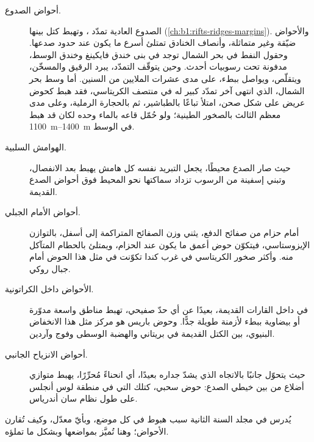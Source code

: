 \begin{description}
  \item[أحواض الصدوع.] الصدوع العادية تمدّد ، وتهبط كتل بينها (\cref{ch:b1:rifts-ridges-margins}). والأحواض ضيّقة وغير متماثلة، وأنصاف الخنادق تمتلئ أسرع ما يكون عند حدود صدعها. وحقول النفط في بحر الشمال توجد في بنى خندق فايكينغ وخندق الوسط، مدفونة تحت رسوبيات أحدث. وحين يتوقّف التمدّد، يبرد  الرقيق والمسخّن، ويتقلّص، ويواصل  ببطء، على مدى عشرات الملايين من السنين. أما وسط بحر الشمال، الذي انتهى آخر تمدّد كبير له في منتصف الكريتاسي، فقد هبط كحوض عريض على شكل صحن، امتلأ تباعًا بالطباشير، ثم بالحجارة الرملية، وعلى مدى معظم الثالث بالصخور الطينية؛ ولو حُمّل قاعه بالماء وحده لكان قد هبط \qtyrange{1100}{1400}{m} في الوسط.
  \item[الهوامش السلبية.] حيث صار الصدع محيطًا، يجعل التبريد نفسه كل هامش يهبط بعد الانفصال، وتبني إسفينة من الرسوب تزداد سماكتها نحو المحيط فوق أحواض الصدع القديمة.
  \item[أحواض الأمام الجبلي.] أمام حزام من صفائح الدفع، يثني وزن الصفائح المتراكمة  إلى أسفل، بالتوازن الإيزوستاسي، فيتكوّن حوض أعمق ما يكون عند الحزام، ويمتلئ بالحطام المتآكل منه. وأكثر صخور الكريتاسي في غرب كندا تكوّنت في مثل هذا الحوض أمام جبال روكي.
  \item[الأحواض داخل الكراتونية.] في داخل القارات القديمة، بعيدًا عن أي حدّ صفيحي، تهبط مناطق واسعة مدوّرة أو بيضاوية ببطء لأزمنة طويلة جدًّا. وحوض باريس هو مركز مثل هذا الانخفاض البنيوي، بين الكتل القديمة في بريتاني والهضبة الوسطى وفوج وآردين.
  \item[أحواض الانزياح الجانبي.] حيث يتحوّل  جانبًا بالاتجاه الذي يشدّ جداره بعيدًا، أي انحناءً مُحرِّرًا، يهبط متوازي أضلاع من  بين خيطي الصدع: حوض سحبي، كتلك التي في منطقة لوس أنجلس على طول نظام سان أندرياس.
\end{description}

يُدرس في مجلد السنة الثانية سبب هبوط  في كل موضع، وبأيّ معدّل، وكيف تُقارن الأحواض؛ وهنا تُميَّز بمواضعها وبشكل ما تملؤه.


